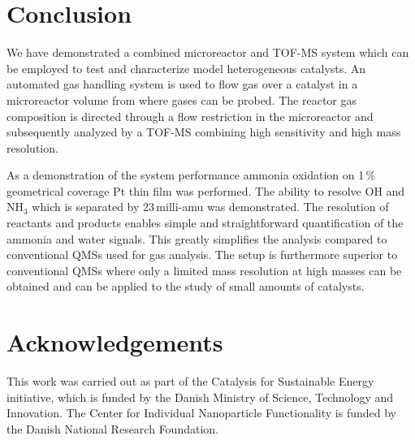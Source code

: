 \documentclass[aip,rsi]{revtex4-1}
\begin{document}
\section{Conclusion}
We have demonstrated a combined microreactor and TOF-MS system which can be employed to test and characterize model heterogeneous catalysts. An automated gas handling system is used to flow gas over a catalyst in a microreactor volume from where gases can be probed. The reactor gas composition is directed through a flow restriction in the microreactor and subsequently analyzed by a TOF-MS combining high sensitivity and high mass resolution.

As a demonstration of the system performance ammonia oxidation on 1\,\% geometrical coverage Pt thin film was performed. The ability to resolve OH and NH$_3$ which is separated by 23\,milli-amu was demonstrated. The resolution of reactants and products enables simple and straightforward quantification of the ammonia and water signals. This greatly simplifies the analysis compared to conventional QMSs used for gas analysis. The setup is furthermore superior to conventional QMSs where only a limited mass resolution at high masses can be obtained and can be applied to the study of small amounts of catalysts.

\section{Acknowledgements}
This work was carried out as part of the Catalysis for Sustainable Energy initiative, which is funded by the Danish Ministry of Science, Technology and Innovation. The Center for Individual Nanoparticle Functionality is funded by the Danish National Research Foundation.


%
%
\end{document}
